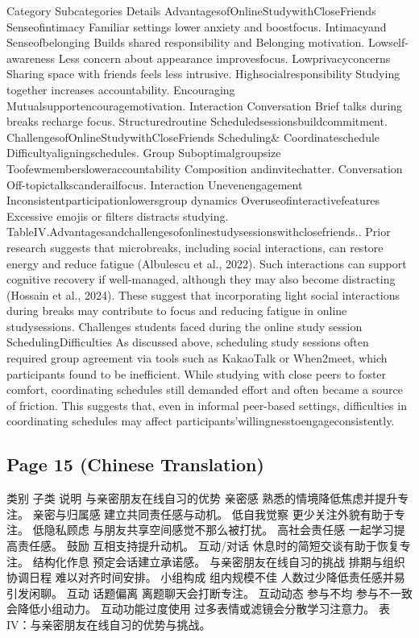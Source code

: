 \documentclass[12pt]{ctexart}
\begin{document}
Category Subcategories Details
AdvantagesofOnlineStudywithCloseFriends
Senseofintimacy Familiar settings lower anxiety and
boostfocus.
Intimacyand
Senseofbelonging Builds shared responsibility and
Belonging
motivation.
Lowself-awareness Less concern about appearance
improvesfocus.
Lowprivacyconcerns Sharing space with friends feels less
intrusive.
Highsocialresponsibility Studying together increases
accountability.
Encouraging Mutualsupportencouragemotivation.
Interaction Conversation Brief talks during breaks recharge
focus.
Structuredroutine Scheduledsessionsbuildcommitment.
ChallengesofOnlineStudywithCloseFriends
Scheduling\& Coordinateschedule Difficultyaligningschedules.
Group Suboptimalgroupsize Toofewmembersloweraccountability
Composition andinvitechatter.
Conversation Off-topictalkscanderailfocus.
Interaction
Unevenengagement Inconsistentparticipationlowersgroup
dynamics
Overuseofinteractivefeatures Excessive emojis or filters distracts
studying.
TableIV.Advantagesandchallengesofonlinestudysessionswithclosefriends..
Prior research suggests that microbreaks, including social interactions, can
restore energy and reduce fatigue (Albulescu et al., 2022). Such interactions can
support cognitive recovery if well-managed, although they may also become
distracting (Hossain et al., 2024). These suggest that incorporating light social
interactions during breaks may contribute to focus and reducing fatigue in online
studysessions.
Challenges students faced during the online study session
SchedulingDifficulties
As discussed above, scheduling study sessions often required group agreement via
tools such as KakaoTalk or When2meet, which participants found to be inefficient.
While studying with close peers to foster comfort, coordinating schedules still
demanded effort and often became a source of friction. This suggests that, even in
informal peer-based settings, difficulties in coordinating schedules may affect
participants’willingnesstoengageconsistently.

\subsection*{Page 15 (Chinese Translation)}

类别  子类  说明
与亲密朋友在线自习的优势
亲密感  熟悉的情境降低焦虑并提升专注。
亲密与归属感  建立共同责任感与动机。
低自我觉察  更少关注外貌有助于专注。
低隐私顾虑  与朋友共享空间感觉不那么被打扰。
高社会责任感  一起学习提高责任感。
鼓励  互相支持提升动机。
互动/对话  休息时的简短交谈有助于恢复专注。
结构化作息  预定会话建立承诺感。
与亲密朋友在线自习的挑战
排期与组织  协调日程  难以对齐时间安排。
小组构成  组内规模不佳  人数过少降低责任感并易引发闲聊。
互动  话题偏离  离题聊天会打断专注。
互动动态  参与不均  参与不一致会降低小组动力。
互动功能过度使用  过多表情或滤镜会分散学习注意力。
表 IV：与亲密朋友在线自习的优势与挑战。
\end{document}
